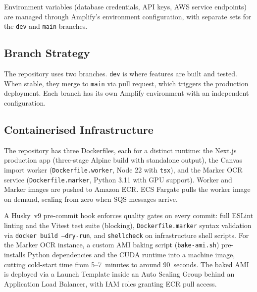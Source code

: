 \documentclass[12pt,a4paper]{article}
\newcommand{\tech}[1]{\texttt{#1}}
\begin{document}
Environment variables (database credentials, API keys, AWS service endpoints) are managed through Amplify's environment configuration, with separate sets for the \tech{dev} and \tech{main} branches.

\subsection{Branch Strategy}

The repository uses two branches. \tech{dev} is where features are built and tested. When stable, they merge to \tech{main} via pull request, which triggers the production deployment. Each branch has its own Amplify environment with an independent configuration.

\subsection{Containerised Infrastructure}

\begin{sloppypar}
The repository has three Dockerfiles, each for a distinct runtime: the Next.js production app (three-stage Alpine build with standalone output), the Canvas import worker (\tech{Dockerfile.worker}, Node 22 with \tech{tsx}), and the Marker OCR service (\tech{Dockerfile.marker}, Python 3.11 with GPU support). Worker and Marker images are pushed to Amazon ECR. ECS Fargate pulls the worker image on demand, scaling from zero when SQS messages arrive.

A Husky~v9 pre-commit hook enforces quality gates on every commit: full ESLint linting and the Vitest test suite (blocking), \tech{Dockerfile.marker} syntax validation via \tech{docker build --dry-run}, and \tech{shellcheck} on infrastructure shell scripts. For the Marker OCR instance, a custom AMI baking script (\tech{bake-ami.sh}) pre-installs Python dependencies and the CUDA runtime into a machine image, cutting cold-start time from 5--7~minutes to around 90~seconds. The baked AMI is deployed via a Launch Template inside an Auto Scaling Group behind an Application Load Balancer, with IAM roles granting ECR pull access.
\end{sloppypar}
\end{document}
